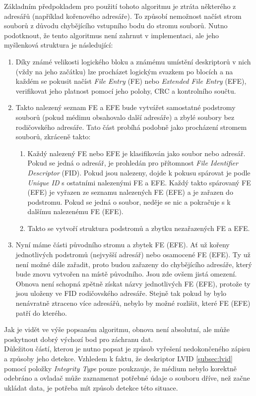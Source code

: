 Základním předpokladem pro použití tohoto algoritmu je ztráta některého z adresářů (například kořenového adresáře). To způsobí nemožnost načíst strom souborů z důvodu chybějícího vstupního bodu do stromu souborů. Nutno podotknout, že tento algoritmus není zahrnut v implementaci, ale jeho myšlenková struktura je následující:
\begin{enumerate}
    \item Díky známé velikosti logického bloku a známému umístění deskriptorů v nich (vždy na jeho začátku) lze procházet logickým svazkem po blocích a na každém se pokusit načíst \textit{File Entry} (FE) nebo \textit{Extended File Entry} (EFE), verifikovat jeho platnost pomocí jeho polohy, CRC a kontrolního součtu.
    \item Takto nalezený seznam FE a EFE bude vytvářet samostatné podstromy souborů (pokud médimu obsahovalo další adresáře) a zbylé soubory bez rodičovského adresáře. Tato část probíhá podobně jako procházení stromem souborů, zkráceně takto:
    \begin{enumerate}
        \item Každý nalezený FE nebo EFE je klasifikován jako soubor nebo adresář. Pokud se jedná o adresář, je prohledán pro přítomnost \textit{File Identifier Descriptor} (FID). Pokud jsou nalezeny, dojde k pokusu spárovat je podle \textit{Unique ID} s ostatními nalezenými FE a EFE. Každý takto spárovaný FE (EFE) je vyřazen ze seznamu nalezených FE (EFE) a je zařazen do podstromu. Pokud se jedná o soubor, neděje se nic a pokračuje s k dalšímu nalezenému FE (EFE).
        \item Takto se vytvoří struktura podstromů a zbytku nezařazených FE a EFE.
    \end{enumerate}
    \item Nyní máme části původního stromu a zbytek FE (EFE). Ať už kořeny jednotlivých podstromů (nejvyšší adresář) nebo osamocené FE (EFE). Ty už není možné dále zařadit, proto budou zařazeny do chybějícího adresáře, který bude znovu vytvořen na místě původního. Jsou zde ovšem jistá omezení. Obnova není schopná zpětně získat názvy jednotlivých FE (EFE), protože ty jsou uloženy ve FID rodičovského adresáře. Stejně tak pokud by bylo nenávratně ztraceno více adresářů, nebylo by možné rozlišit, které FE (EFE) patří do kterého. 
\end{enumerate}
Jak je vidět ve výše popsaném algoritmu, obnova není absolutní, ale může poskytnout dobrý výchozí bod pro záchranu dat.\\
Důležitou částí, kterou je nutno popsat je způsob vyřešení nedokončeného zápisu a způsoby jeho detekce. Vzhledem k faktu, že deskriptor LVID \ref{subsec:lvid} pomocí položky \textit{Integrity Type} pouze poukzauje, že médium nebylo korektně odebráno a ovladač může zaznamenat potřebné údaje o souboru dříve, než začne ukládat data, je potřeba mít způsob detekce této situace.\\
